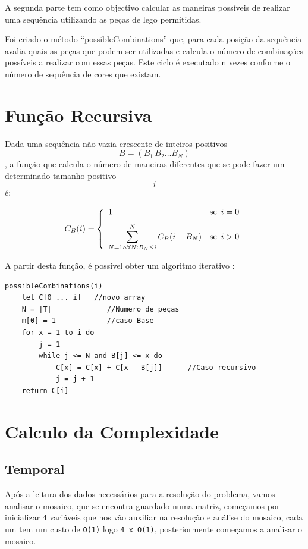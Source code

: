 \documentclass{article}
\begin{document}
A segunda parte tem como objectivo calcular as maneiras possíveis de realizar uma sequência utilizando as peças de lego permitidas.

Foi criado o método “possibleCombinations” que, para cada posição da sequência avalia quais as peças que podem ser utilizadas e calcula o número de combinações possíveis a realizar com essas peças. Este ciclo é executado n vezes conforme o número de sequência de cores que existam.


\section{Função Recursiva}
Dada uma sequência não vazia crescente de inteiros positivos \begin{equation*} B = (B_1 \, B_2 \ldots B_N) \end{equation*} , a função que calcula o número de maneiras diferentes que se pode fazer um determinado tamanho positivo\begin{equation*} i \end{equation*}é:\\
\begin{center}
\begin{equation*}
C_B(i) = \left \{
	    \begin{array}{l@{\quad}l}
	      1  & \mbox{se }\, i = 0          \\[8pt]
	      \displaystyle 
	      \sum_{N = 1 \land  \forall N : B_N \le i   }^{N} C_B(i-B_N)
		& \mbox{se }\, i > 0
	  \end{array} \right .
\end{equation*}
\end{center} 
A partir desta função, é possível obter um algoritmo iterativo :
\begin{lstlisting}
possibleCombinations(i)
    let C[0 ... i]   //novo array
    N = |T|             //Numero de peças
    m[0] = 1            //caso Base
    for x = 1 to i do
        j = 1
        while j <= N and B[j] <= x do
            C[x] = C[x] + C[x - B[j]]      //Caso recursivo
            j = j + 1
    return C[i]
\end{lstlisting}


\section{Calculo da Complexidade}

\subsection{Temporal}
Após a leitura dos dados necessários para a resolução do problema, vamos  analisar o mosaico,  que se encontra guardado numa matriz, começamos por inicializar 4 variáveis que nos vão auxiliar na resolução e análise do mosaico, cada um tem um custo de \verb|O(1)| logo \verb|4 x O(1)|, posteriormente começamos a analisar o mosaico. 
\end{document}
